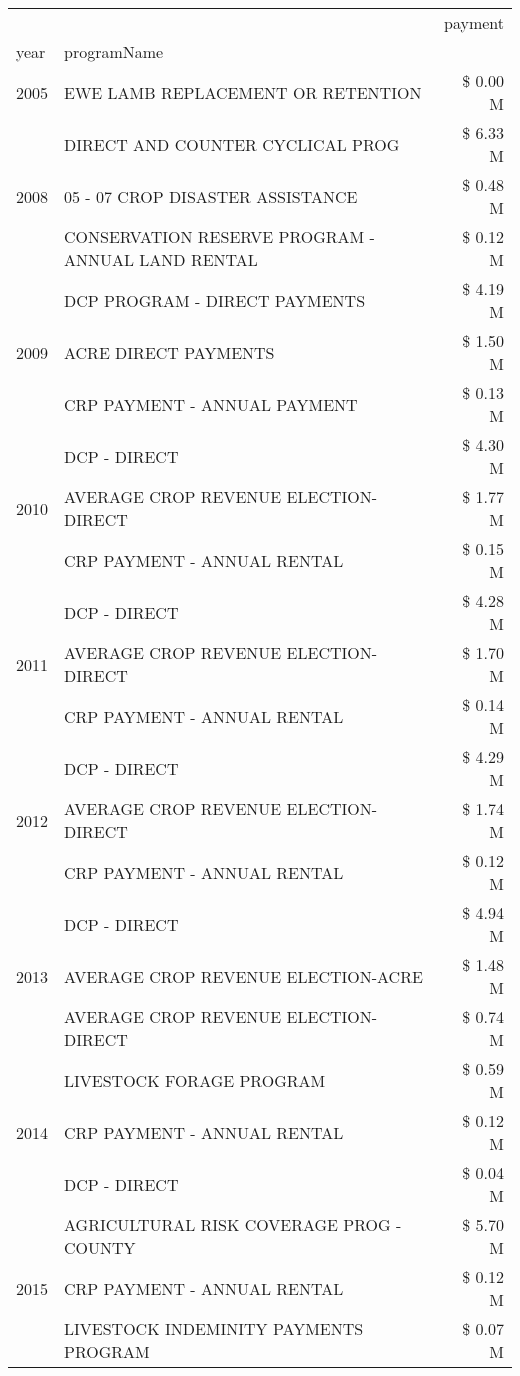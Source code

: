 \begin{tabular}{llr}
\toprule
 &  & payment \\
year & programName &  \\
\midrule
2005 & EWE LAMB REPLACEMENT OR RETENTION & \$ 0.00 M \\
\cline{1-3}
\multirow[t]{3}{*}{2008} & DIRECT AND COUNTER CYCLICAL PROG & \$ 6.33 M \\
 & 05 - 07 CROP DISASTER ASSISTANCE & \$ 0.48 M \\
 & CONSERVATION RESERVE PROGRAM - ANNUAL LAND RENTAL & \$ 0.12 M \\
\cline{1-3}
\multirow[t]{3}{*}{2009} & DCP PROGRAM - DIRECT PAYMENTS & \$ 4.19 M \\
 & ACRE DIRECT PAYMENTS & \$ 1.50 M \\
 & CRP PAYMENT - ANNUAL PAYMENT & \$ 0.13 M \\
\cline{1-3}
\multirow[t]{3}{*}{2010} & DCP - DIRECT & \$ 4.30 M \\
 & AVERAGE CROP REVENUE ELECTION-DIRECT & \$ 1.77 M \\
 & CRP PAYMENT - ANNUAL RENTAL & \$ 0.15 M \\
\cline{1-3}
\multirow[t]{3}{*}{2011} & DCP - DIRECT & \$ 4.28 M \\
 & AVERAGE CROP REVENUE ELECTION-DIRECT & \$ 1.70 M \\
 & CRP PAYMENT - ANNUAL RENTAL & \$ 0.14 M \\
\cline{1-3}
\multirow[t]{3}{*}{2012} & DCP - DIRECT & \$ 4.29 M \\
 & AVERAGE CROP REVENUE ELECTION-DIRECT & \$ 1.74 M \\
 & CRP PAYMENT - ANNUAL RENTAL & \$ 0.12 M \\
\cline{1-3}
\multirow[t]{3}{*}{2013} & DCP - DIRECT & \$ 4.94 M \\
 & AVERAGE CROP REVENUE ELECTION-ACRE & \$ 1.48 M \\
 & AVERAGE CROP REVENUE ELECTION-DIRECT & \$ 0.74 M \\
\cline{1-3}
\multirow[t]{3}{*}{2014} & LIVESTOCK FORAGE PROGRAM & \$ 0.59 M \\
 & CRP PAYMENT - ANNUAL RENTAL & \$ 0.12 M \\
 & DCP - DIRECT & \$ 0.04 M \\
\cline{1-3}
\multirow[t]{3}{*}{2015} & AGRICULTURAL RISK COVERAGE PROG - COUNTY & \$ 5.70 M \\
 & CRP PAYMENT - ANNUAL RENTAL & \$ 0.12 M \\
 & LIVESTOCK INDEMINITY PAYMENTS PROGRAM & \$ 0.07 M \\

\end{tabular}
